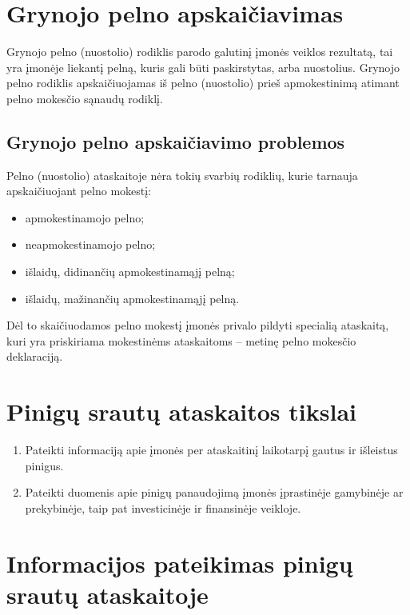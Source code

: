 \section{Grynojo pelno apskaičiavimas}


Grynojo pelno (nuostolio) rodiklis parodo galutinį įmonės veiklos
rezultatą, tai yra įmonėje liekantį pelną, kuris gali būti
paskirstytas, arba nuostolius. Grynojo pelno rodiklis apskaičiuojamas
iš pelno (nuostolio) prieš apmokestinimą atimant pelno mokesčio
sąnaudų rodiklį.

\subsection{Grynojo pelno apskaičiavimo problemos}


Pelno (nuostolio) ataskaitoje nėra tokių svarbių rodiklių, kurie
tarnauja apskaičiuojant pelno mokestį:
\begin{itemize}
  \item apmokestinamojo pelno;
  \item neapmokestinamojo pelno;
  \item išlaidų, didinančių apmokestinamąjį pelną;
  \item išlaidų, mažinančių apmokestinamąjį pelną.
\end{itemize}

Dėl to skaičiuodamos pelno mokestį įmonės privalo pildyti specialią
ataskaitą, kuri yra priskiriama mokestinėms ataskaitoms – metinę pelno
mokesčio deklaraciją.

\section{Pinigų srautų ataskaitos tikslai}



\begin{enumerate}
  \item Pateikti informaciją apie įmonės per ataskaitinį laikotarpį
    gautus ir išleistus pinigus.
  \item Pateikti duomenis apie pinigų panaudojimą įmonės įprastinėje
    gamybinėje ar prekybinėje, taip pat investicinėje ir finansinėje
    veikloje.
\end{enumerate}

\section{Informacijos pateikimas pinigų srautų ataskaitoje}


